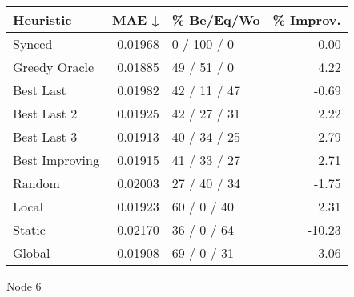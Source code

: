 \begin{tabular}{lrlr}
\toprule
\textbf{Heuristic} & \textbf{MAE ↓} & \textbf{\% Be/Eq/Wo} & \textbf{\% Improv.} \\
\midrule
            Synced &        0.01968 &          0 / 100 / 0 &                0.00 \\
     Greedy Oracle &        0.01885 &          49 / 51 / 0 &                4.22 \\
         Best Last &        0.01982 &         42 / 11 / 47 &               -0.69 \\
       Best Last 2 &        0.01925 &         42 / 27 / 31 &                2.22 \\
       Best Last 3 &        0.01913 &         40 / 34 / 25 &                2.79 \\
    Best Improving &        0.01915 &         41 / 33 / 27 &                2.71 \\
            Random &        0.02003 &         27 / 40 / 34 &               -1.75 \\
             Local &        0.01923 &          60 / 0 / 40 &                2.31 \\
            Static &        0.02170 &          36 / 0 / 64 &              -10.23 \\
            Global &        0.01908 &          69 / 0 / 31 &                3.06 \\
\bottomrule
\end{tabular}
\caption{Node 6}
\label{tab:non_lr01_le2_bs4_6}
